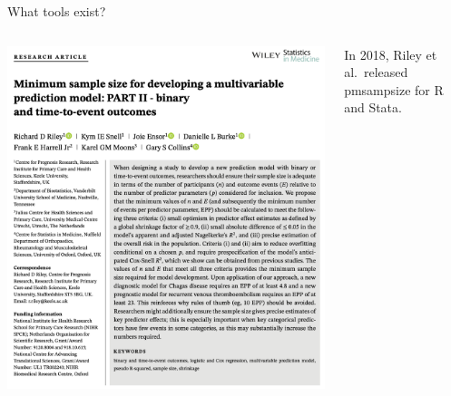 \documentclass[11pt]{beamer}
\begin{document}
\begin{frame}[t]{What tools exist?}
	\begin{columns}
		\begin{column}[c]{0.5\textwidth}
			\includegraphics[width=\textwidth]{figures/riley2.png}%
		\end{column}
		\begin{column}[c]{0.5\textwidth}
            In 2018, Riley et al.\ released \alert{pmsampsize} for R and Stata.
		\end{column}
	\end{columns}

\end{frame}
\end{document}
